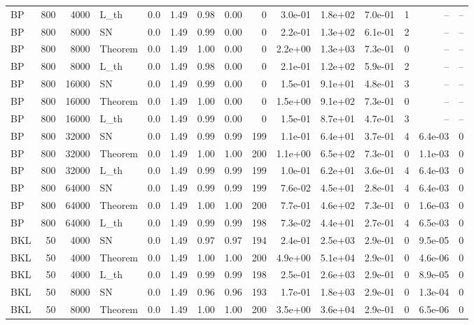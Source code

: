 \begin{tabular}{lrrlrrrrrrrrrrr}
BP & 800 & 4000 & L\_th & 0.0 & 1.49 & 0.98 & 0.00 & 0 & 3.0e-01 & 1.8e+02 & 7.0e-01 & 1 & -- & -- \\
BP & 800 & 8000 & SN & 0.0 & 1.49 & 0.99 & 0.00 & 0 & 2.2e-01 & 1.3e+02 & 6.1e-01 & 2 & -- & -- \\
BP & 800 & 8000 & Theorem & 0.0 & 1.49 & 1.00 & 0.00 & 0 & 2.2e+00 & 1.3e+03 & 7.3e-01 & 0 & -- & -- \\
BP & 800 & 8000 & L\_th & 0.0 & 1.49 & 0.98 & 0.00 & 0 & 2.1e-01 & 1.2e+02 & 5.9e-01 & 2 & -- & -- \\
BP & 800 & 16000 & SN & 0.0 & 1.49 & 0.99 & 0.00 & 0 & 1.5e-01 & 9.1e+01 & 4.8e-01 & 3 & -- & -- \\
BP & 800 & 16000 & Theorem & 0.0 & 1.49 & 1.00 & 0.00 & 0 & 1.5e+00 & 9.1e+02 & 7.3e-01 & 0 & -- & -- \\
BP & 800 & 16000 & L\_th & 0.0 & 1.49 & 0.99 & 0.00 & 0 & 1.5e-01 & 8.7e+01 & 4.7e-01 & 3 & -- & -- \\
BP & 800 & 32000 & SN & 0.0 & 1.49 & 0.99 & 0.99 & 199 & 1.1e-01 & 6.4e+01 & 3.7e-01 & 4 & 6.4e-03 & 0 \\
BP & 800 & 32000 & Theorem & 0.0 & 1.49 & 1.00 & 1.00 & 200 & 1.1e+00 & 6.5e+02 & 7.3e-01 & 0 & 1.1e-03 & 0 \\
BP & 800 & 32000 & L\_th & 0.0 & 1.49 & 0.99 & 0.99 & 199 & 1.0e-01 & 6.2e+01 & 3.6e-01 & 4 & 6.4e-03 & 0 \\
BP & 800 & 64000 & SN & 0.0 & 1.49 & 0.99 & 0.99 & 199 & 7.6e-02 & 4.5e+01 & 2.8e-01 & 4 & 6.4e-03 & 0 \\
BP & 800 & 64000 & Theorem & 0.0 & 1.49 & 1.00 & 1.00 & 200 & 7.7e-01 & 4.6e+02 & 7.3e-01 & 0 & 1.6e-03 & 0 \\
BP & 800 & 64000 & L\_th & 0.0 & 1.49 & 0.99 & 0.99 & 198 & 7.3e-02 & 4.4e+01 & 2.7e-01 & 4 & 6.5e-03 & 0 \\
BKL & 50 & 4000 & SN & 0.0 & 1.49 & 0.97 & 0.97 & 194 & 2.4e-01 & 2.5e+03 & 2.9e-01 & 0 & 9.5e-05 & 0 \\
BKL & 50 & 4000 & Theorem & 0.0 & 1.49 & 1.00 & 1.00 & 200 & 4.9e+00 & 5.1e+04 & 2.9e-01 & 0 & 4.6e-06 & 0 \\
BKL & 50 & 4000 & L\_th & 0.0 & 1.49 & 0.99 & 0.99 & 198 & 2.5e-01 & 2.6e+03 & 2.9e-01 & 0 & 8.9e-05 & 0 \\
BKL & 50 & 8000 & SN & 0.0 & 1.49 & 0.96 & 0.96 & 193 & 1.7e-01 & 1.8e+03 & 2.9e-01 & 0 & 1.3e-04 & 0 \\
BKL & 50 & 8000 & Theorem & 0.0 & 1.49 & 1.00 & 1.00 & 200 & 3.5e+00 & 3.6e+04 & 2.9e-01 & 0 & 6.5e-06 & 0 \\

\end{tabular}
